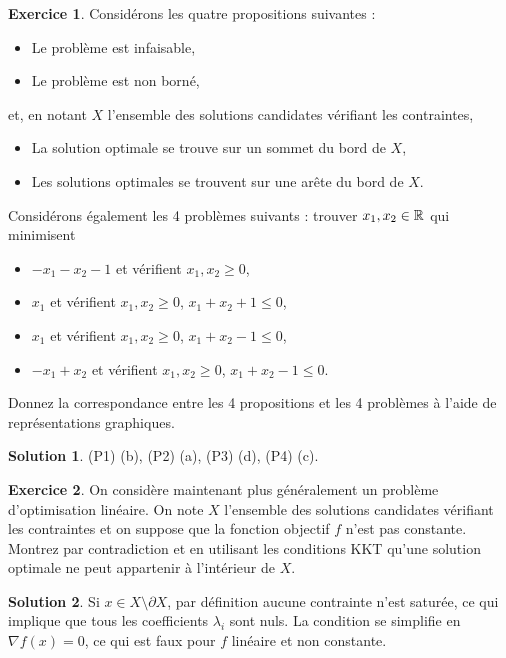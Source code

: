 \documentclass[a4paper,francais]{article}
\newcommand{\R}{{\ensuremath\mathbb{R}}}
\theoremstyle{definition}
\newtheorem{exercice}{Exercice}[section]
\newtheorem*{solution}{Solution}
\begin{document}
\begin{exercice}
  \label{ex:ex}
  Considérons les quatre propositions suivantes :
  \begin{itemize}
  \item[(a)] Le problème est infaisable,
  \item[(b)] Le problème est non borné,
  \end{itemize}
  et, en notant $X$ l'ensemble des
  solutions candidates vérifiant les contraintes,
  \begin{itemize}
  \item[(c)] La solution optimale se trouve sur un sommet du bord de $X$,
  \item[(d)] Les solutions optimales se trouvent sur une arête du bord de $X$.
  \end{itemize}
  
  Considérons également les 4 problèmes suivants : trouver $x_1,x_2 \in \R$ qui minimisent 
  \begin{itemize}
    \item[(P1)] $-x_1 - x_2 - 1$ et vérifient $x_1,x_2 \geq 0$,   %
    \item[(P2)] $x_1$ et vérifient $x_1,x_2 \geq 0$, $x_1 + x_2 + 1 \leq 0$, %
    \item[(P3)] $x_1$ et vérifient $x_1,x_2 \geq 0$, $x_1 + x_2 - 1 \leq 0$, %
    \item[(P4)] $-x_1+x_2$ et vérifient $x_1,x_2 \geq 0$, $x_1 + x_2 - 1 \leq 0$. %
  \end{itemize}
  
  Donnez la correspondance entre les 4 propositions et les 4 problèmes
  à l'aide de représentations graphiques.
\end{exercice}

\begin{solution}
  (P1) (b), (P2) (a), (P3) (d), (P4) (c). 
\end{solution}

\begin{exercice}
  On considère maintenant plus généralement un problème d'optimisation linéaire. 
  On note $X$ l'ensemble des solutions candidates vérifiant les contraintes et
  on suppose que la fonction objectif $f$ n'est pas constante. Montrez par
  contradiction et en utilisant les conditions KKT qu'une solution optimale 
  ne peut appartenir à l'intérieur de $X$.
\end{exercice}

\begin{solution}
  Si $x \in X \setminus \partial X$, par définition aucune contrainte n'est saturée,
  ce qui implique que tous les coefficients $\lambda_i$ sont nuls. La condition
  se simplifie en ${\nabla f}(x) = 0$, ce qui est faux pour $f$ linéaire et non constante.
\end{solution}
\end{document}
